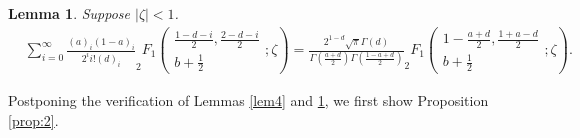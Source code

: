 \documentclass{svjour3}
\newtheorem{lemma}{Lemma}
\begin{document}
\begin{lemma}
  \label{lem:Fisum}Suppose $| \zeta | < 1$.
  \begin{eqnarray}
    & \sum_{i = 0}^{\infty} \frac{(a)_i (1 - a)_i}{2^i i! (d)_i} _2 F_1
    \left( \begin{array}{c}
      \frac{1 - d - i}{2}, \frac{2 - d - i}{2}\\
      b + \frac{1}{2}
    \end{array} ; \zeta \right) = \frac{2^{1 - d} \sqrt{\pi} \Gamma
    (d)}{\Gamma \left( \frac{a + d}{2} \right) \Gamma \left( \frac{1 - a +
    d}{2} \right)} _2 F_1 \left( \begin{array}{c}
      1 - \frac{a + d}{2}, \frac{1 + a - d}{2}\\
      b + \frac{1}{2}
    \end{array} ; \zeta \right) .  \label{eqn:iF} & 
  \end{eqnarray}
\end{lemma}

Postponing the verification of Lemmas \ref{lem4} and \ref{lem:Fisum}, we first
show Proposition \ref{prop:2}.
\end{document}
